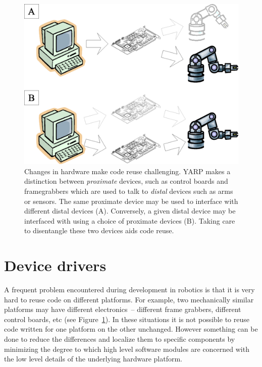 \begin{figure}[t]
\centerline{\includegraphics[width=\columnwidth]{fig-devices}}
\caption{
Changes in hardware make code reuse challenging.
YARP makes a distinction between {\em proximate} devices,
such as control boards and framegrabbers which are used to
talk to {\em distal} devices such as arms or sensors.  The 
same proximate device may be used to interface with different
distal devices (A).   Conversely, a given distal device may be
interfaced with using a choice of proximate devices (B).
Taking care to disentangle these two devices aids code reuse.
}
\label{fig:devices}
\end{figure}

\section{Device drivers}

A frequent problem encountered during development in robotics is that
it is very hard to reuse code on different platforms. 
%
%
For example, two mechanically similar platforms may have different
electronics~--
%
different frame grabbers, different
control boards, etc (see Figure~\ref{fig:devices}). 
In these situations it is not possible to reuse code
written for one platform on the other unchanged. 
However something can be done to
reduce the differences and localize them to specific components
by minimizing the degree to which
high level software modules are 
concerned with the low level details of the underlying hardware
platform.

